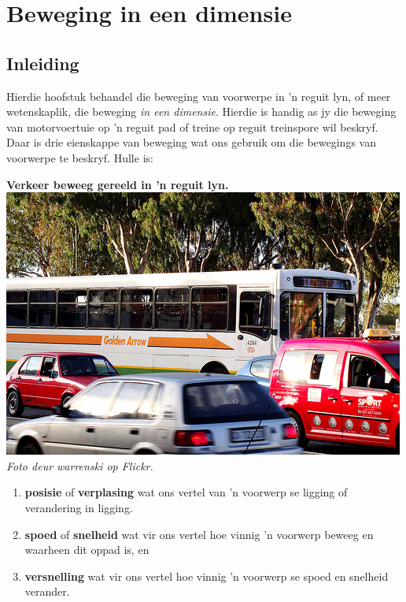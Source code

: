 \chapter{Beweging in een dimensie}
\label{chap:motion}
 
\section{Inleiding}

\begin{minipage}{.5\textwidth}
Hierdie hoofstuk behandel die beweging van voorwerpe in  'n reguit lyn, of meer wetenskaplik, die beweging \textsl{in een dimensie}. Hierdie is handig as jy die beweging van motorvoertuie op  'n reguit pad of treine op reguit treinspore wil beskryf. Daar is drie eienskappe van beweging wat ons gebruik om die bewegings van voorwerpe te beskryf. Hulle is:\par
\end{minipage}
\begin{minipage}{.5\textwidth}
\begin{center}
\textbf{Verkeer beweeg gereeld in  'n reguit lyn.}\\
 \includegraphics[width=.8\textwidth]{photos/trafficby_warrenski_flickr.jpg}\\
\textit{Foto deur warrenski op Flickr.}
\end{center}
\end{minipage}
   
\begin{enumerate}[noitemsep, label=\textbf{\arabic*}. ] 
    \item \textbf{posisie} of \textbf{verplasing} wat ons vertel van  'n voorwerp se ligging of verandering in ligging.
    \item \textbf{spoed} of \textbf{snelheid} wat vir ons vertel hoe vinnig  'n voorwerp beweeg en waarheen dit oppad is, en
    \item \textbf{versnelling} wat vir ons vertel hoe vinnig  'n voorwerp se spoed en snelheid verander. 
\end{enumerate}

